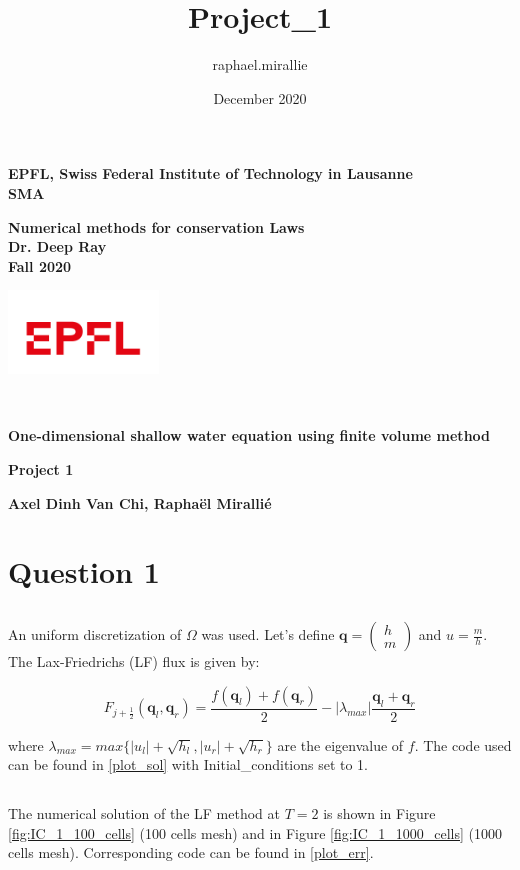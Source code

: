 \documentclass[11pt,a4paper]{article}
\title{Project_1}
\author{raphael.mirallie }
\date{December 2020}
\begin{document}
\noindent \parbox[b]{12 cm}{
  \small
{\bf EPFL, Swiss Federal Institute of Technology in Lausanne} \\
{\bf SMA}

\bigskip

{\bf Numerical methods for conservation Laws}\\
{\bf Dr. Deep Ray}\\
{\bf Fall 2020}

} \hfill \includegraphics[width=4cm]{epfl_logo.jpg}

\noindent\hrulefill\\
\centerline{\large \bf One-dimensional shallow water equation using finite volume method}\vspace{2ex}
\centerline{\bf Project 1}
\centerline{\bf  Axel Dinh Van Chi, Rapha\"el Miralli\'e}


\graphicspath{ {pictures/} }

\section{Question 1}
\subsection{}

An uniform discretization of $\Omega$ was used. Let's define $\mathbf{q}=\begin{pmatrix} h \\ m \end{pmatrix}$ and $u=\frac{m}{h}$. The Lax-Friedrichs (LF) flux is given by:

\[F_{j+\frac{1}{2}}(\mathbf{q}_l,\mathbf{q}_r)=\frac{f(\mathbf{q}_l)+f(\mathbf{q}_r)}{2} - |\lambda_{max}|\frac{\mathbf{q}_l+\mathbf{q}_r}{2}\] 

where $\lambda_{max}=max\{|u_l|+\sqrt{h_l},|u_r|+\sqrt{h_r}\}$ are the eigenvalue of $f$.
The code used can be found in \ref{plot_sol} with Initial\_conditions set to 1.

\subsection{}
The numerical solution of the LF method at $T=2$ is shown in Figure \ref{fig:IC_1_100_cells} (100 cells mesh) and in Figure \ref{fig:IC_1_1000_cells} (1000 cells mesh). Corresponding code can be found in \ref{plot_err}.
\end{document}
